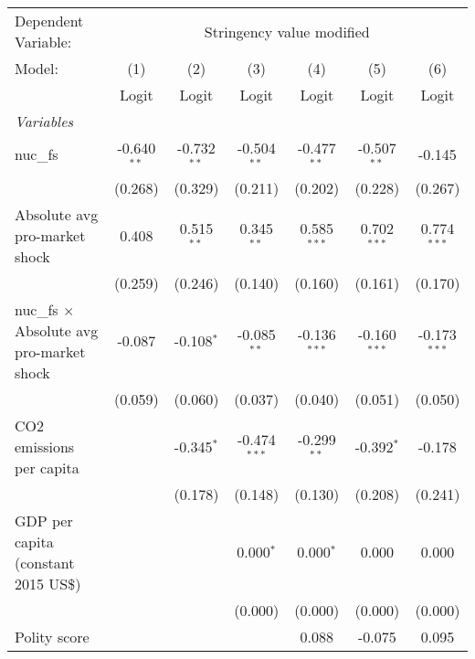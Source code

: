 
\begingroup
\centering
\begin{tabular}{lcccccc}
   \toprule
   Dependent Variable: & \multicolumn{6}{c}{Stringency value modified}\\
   Model:                                           & (1)           & (2)           & (3)            & (4)            & (5)            & (6)\\  
                                                    &  Logit        & Logit         & Logit          & Logit          & Logit          & Logit\\  
   \midrule
   \emph{Variables}\\
   nuc\_fs                                          & -0.640$^{**}$ & -0.732$^{**}$ & -0.504$^{**}$  & -0.477$^{**}$  & -0.507$^{**}$  & -0.145\\   
                                                    & (0.268)       & (0.329)       & (0.211)        & (0.202)        & (0.228)        & (0.267)\\   
   Absolute avg pro-market shock                    & 0.408         & 0.515$^{**}$  & 0.345$^{**}$   & 0.585$^{***}$  & 0.702$^{***}$  & 0.774$^{***}$\\   
                                                    & (0.259)       & (0.246)       & (0.140)        & (0.160)        & (0.161)        & (0.170)\\   
   nuc\_fs $\times$ Absolute avg pro-market shock   & -0.087        & -0.108$^{*}$  & -0.085$^{**}$  & -0.136$^{***}$ & -0.160$^{***}$ & -0.173$^{***}$\\   
                                                    & (0.059)       & (0.060)       & (0.037)        & (0.040)        & (0.051)        & (0.050)\\   
   CO2 emissions per capita                         &               & -0.345$^{*}$  & -0.474$^{***}$ & -0.299$^{**}$  & -0.392$^{*}$   & -0.178\\   
                                                    &               & (0.178)       & (0.148)        & (0.130)        & (0.208)        & (0.241)\\   
   GDP per capita (constant 2015 US\$)              &               &               & 0.000$^{*}$    & 0.000$^{*}$    & 0.000          & 0.000\\   
                                                    &               &               & (0.000)        & (0.000)        & (0.000)        & (0.000)\\   
   Polity score                                     &               &               &                & 0.088          & -0.075         & 0.095\\   

\end{tabular}
